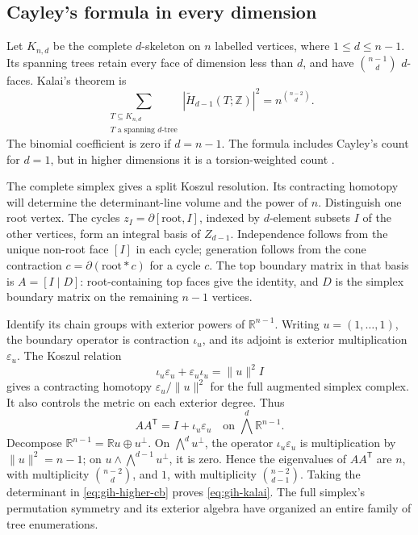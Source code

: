 \documentclass[11pt]{article}
\theoremstyle{definition}
\theoremstyle{remark}
\newcommand{\Z}{\mathbb Z}
\newcommand{\R}{\mathbb R}
\begin{document}
\subsection{Cayley's formula in every dimension}

Let \(K_{n,d}\) be the complete \(d\)-skeleton on \(n\) labelled
vertices, where \(1\le d\le n-1\).  Its spanning trees retain every
face of dimension less than \(d\), and have \(\binom{n-1}{d}\)
\(d\)-faces.  Kalai's theorem is
\begin{equation}
 \boxed{\displaystyle
 \sum_{\substack{T\subseteq K_{n,d}\\
             T\text{ a spanning }d\text{-tree}}}
 |\widetilde H_{d-1}(T;\Z)|^2
       =n^{\binom{n-2}{d}}.}
 \label{eq:gih-kalai}
\end{equation}
The binomial coefficient is zero if \(d=n-1\).  The formula includes
Cayley's count for \(d=1\), but in higher dimensions it is a
torsion-weighted count \cite{gih-kalai}.

The complete simplex gives a split Koszul resolution. Its contracting homotopy will determine the determinant-line volume and the power of $n$.  Distinguish one root vertex.  The cycles
\(z_I=\partial[\text{root},I]\), indexed by \(d\)-element subsets
\(I\) of the other vertices, form an integral basis of
\(Z_{d-1}\).  Independence follows from the unique non-root face
\([I]\) in each cycle; generation follows from the cone contraction
\(c=\partial(\text{root}*c)\) for a cycle \(c\).  The top boundary
matrix in that basis is
\(A=[I\mid D]\): root-containing top faces give the identity, and
\(D\) is the simplex boundary matrix on the remaining \(n-1\) vertices.

Identify its chain groups with exterior powers of \(\R^{n-1}\).
Writing $u=(1,\ldots,1)$, the boundary operator is contraction
$\iota_u$, and its adjoint is exterior multiplication
$\varepsilon_u$. The Koszul relation
\[
 \iota_u\varepsilon_u+\varepsilon_u\iota_u=\|u\|^2I
\]
gives a contracting homotopy $\varepsilon_u/\|u\|^2$ for the full augmented simplex complex. It also controls the metric on each exterior degree. Thus
\[
 AA^{\mathsf T}=I+\iota_u\varepsilon_u
                  \quad\text{on }\bigwedge^d\R^{n-1}.
\]
Decompose \(\R^{n-1}=\R u\oplus u^\perp\).  On
\(\bigwedge^d u^\perp\), the operator \(\iota_u\varepsilon_u\)
is multiplication by \(\|u\|^2=n-1\); on
\(u\wedge\bigwedge^{d-1}u^\perp\), it is zero.  Hence the eigenvalues
of \(AA^{\mathsf T}\) are \(n\), with multiplicity
\(\binom{n-2}{d}\), and \(1\), with multiplicity
\(\binom{n-2}{d-1}\).  Taking the determinant in
\eqref{eq:gih-higher-cb} proves \eqref{eq:gih-kalai}.
The full simplex's permutation symmetry and its exterior algebra have
organized an entire family of tree enumerations.
\end{document}
